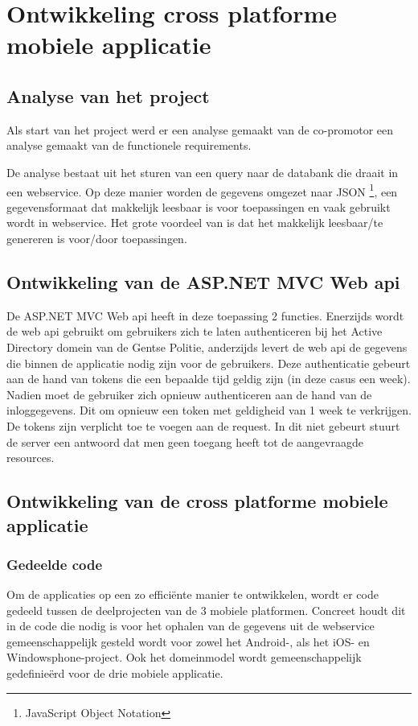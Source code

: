 \chapter{Ontwikkeling cross platforme mobiele applicatie}
\label{ch:ontwikkelingcrossplatformapp}
\section{Analyse van het project}
Als start van het project werd er een analyse gemaakt van de co-promotor
een analyse gemaakt van de functionele requirements.

De analyse bestaat uit het sturen van een query naar de databank die draait in een webservice.
Op deze manier worden de gegevens omgezet naar JSON \footnote{JavaScript Object Notation}, een gegevensformaat dat makkelijk
leesbaar is voor toepassingen en vaak gebruikt wordt in webservice.  Het grote voordeel van \cite{inleidingtotjson}
is dat het makkelijk leesbaar/te genereren is voor/door toepassingen.

\section{Ontwikkeling van de ASP.NET MVC Web api}
De ASP.NET MVC Web api heeft in deze toepassing 2 functies. Enerzijds wordt de web api gebruikt om gebruikers zich te laten
authenticeren bij het Active Directory domein van de Gentse Politie, anderzijds levert de web api de gegevens die binnen
de applicatie nodig zijn voor de gebruikers. Deze authenticatie gebeurt aan de hand van tokens die een bepaalde tijd geldig zijn
(in deze casus een week). Nadien moet de gebruiker zich opnieuw authenticeren aan de hand van de inloggegevens. Dit om opnieuw een
token met geldigheid van 1 week te verkrijgen. De tokens zijn verplicht toe te voegen aan de request. In dit niet gebeurt stuurt
de server een antwoord dat men geen toegang heeft tot de aangevraagde resources.

\section{Ontwikkeling van de cross platforme mobiele applicatie}
\subsection{Gedeelde code}
Om de applicaties op een zo efficiënte manier te ontwikkelen, wordt er code gedeeld tussen de deelprojecten van de 3 mobiele
platformen. Concreet houdt dit in de code die nodig is voor het ophalen van de gegevens uit de webservice gemeenschappelijk
gesteld wordt voor zowel het Android-, als het iOS- en Windowsphone-project. Ook het domeinmodel wordt gemeenschappelijk
gedefinieërd voor de drie mobiele applicatie.

